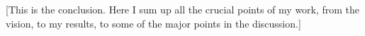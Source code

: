 [This is the conclusion.
Here I sum up all the crucial points of my work, from the vision, to my results, to some of the major points in the discussion.]